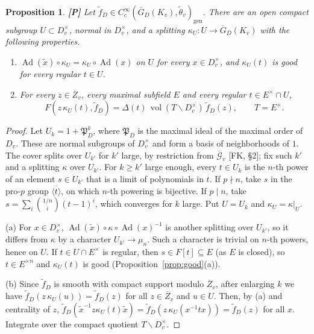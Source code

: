 \documentclass[12pt]{article}
\newcommand{\ov}[1]{\overline{#1}}
\newcommand{\gen}{\mathrm{gen}}
\newcommand{\Ad}{\operatorname{Ad}}
\newcommand{\vol}{\operatorname{vol}}
\newcommand{\Zb}{\ov{Z}}
\newcommand{\GDb}{\ov{G}_D}
\newcommand{\cGb}{\ov{\mathcal{G}}}
\newcommand{\Pv}{\textbf{[P]}}
\theoremstyle{plain}
\newtheorem{proposition}[theorem]{Proposition}
\theoremstyle{definition}
\begin{document}
\begin{proposition}\label{prop:germ}\Pv
Let $\tilde f_D\in C_c^\infty(\GDb(K_v),\tilde\theta_v)_\gen$. There are an open compact subgroup $U\subset D_v^\times$, normal in $D_v^\times$, and a splitting $\kappa_U:U\to\GDb(K_v)$ with the following properties.
\begin{enumerate}[label=(\alph*)]
\item $\Ad(\tilde x)\circ\kappa_U=\kappa_U\circ\Ad(x)$ on $U$ for every $x\in D_v^\times$, and $\kappa_U(t)$ is good for every regular $t\in U$.
\item For every $z\in\Zb_v$, every maximal subfield $E$ and every regular $t\in E^\times\cap U$,
\[ F(z\,\kappa_U(t),\tilde f_D)=\Delta(t)\,\vol(T\backslash D_v^\times)\,\tilde f_D(z),\qquad T=E^\times. \]
\end{enumerate}
\end{proposition}
\begin{proof}
Let $U_k=1+\mathfrak P_D^k$, where $\mathfrak P_D$ is the maximal ideal of the maximal order of $D_v$. These are normal subgroups of $D_v^\times$ and form a basis of neighborhoods of $1$. The cover splits over $U_{k'}$ for $k'$ large, by restriction from $\cGb_v$ [FK, \S2]; fix such $k'$ and a splitting $\kappa$ over $U_{k'}$. For $k\ge k'$ large enough, every $t\in U_k$ is the $n$-th power of an element $s\in U_{k'}$ that is a limit of polynomials in $t$. If $p\nmid n$, take $s$ in the pro-$p$ group $\ov{\langle t\rangle}$, on which $n$-th powering is bijective. If $p\mid n$, take $s=\sum_i\binom{1/n}{i}(t-1)^i$, which converges for $k$ large. Put $U=U_k$ and $\kappa_U=\kappa|_U$.

(a) For $x\in D_v^\times$, $\Ad(\tilde x)\circ\kappa\circ\Ad(x)^{-1}$ is another splitting over $U_{k'}$, so it differs from $\kappa$ by a character $U_{k'}\to\mu_n$. Such a character is trivial on $n$-th powers, hence on $U$. If $t\in U\cap E^\times$ is regular, then $s\in F[t]\subseteq E$ (as $E$ is closed), so $t\in E^{\times n}$ and $\kappa_U(t)$ is good (Proposition~\ref{prop:good}(a)).

(b) Since $\tilde f_D$ is smooth with compact support modulo $\Zb_v$, after enlarging $k$ we have $\tilde f_D(z\,\kappa_U(u))=\tilde f_D(z)$ for all $z\in\Zb_v$ and $u\in U$. Then, by (a) and centrality of $z$, $\tilde f_D(\tilde x^{-1}z\kappa_U(t)\tilde x)=\tilde f_D(z\,\kappa_U(x^{-1}tx))=\tilde f_D(z)$ for all $x$. Integrate over the compact quotient $T\backslash D_v^\times$.
\end{proof}
\end{document}
